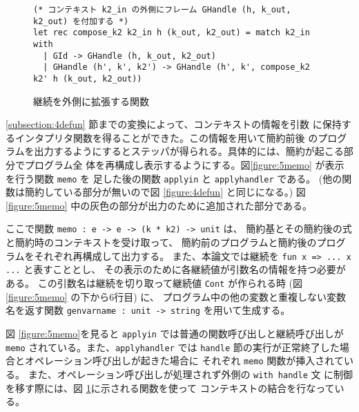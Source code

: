 \begin{figure}
\begin{spacing}{0.9}
\begin{verbatim}
(* コンテキスト k2_in の外側にフレーム GHandle (h, k_out, k2_out) を付加する *)
let rec compose_k2 k2_in h (k_out, k2_out) = match k2_in with
  | GId -> GHandle (h, k_out, k2_out)
  | GHandle (h', k', k2') -> GHandle (h', k', compose_k2 k2' h (k_out, k2_out))
\end{verbatim}
\caption{継続を外側に拡張する関数}
\label{figure:compose}
\end{spacing}
\end{figure}

\ref{subsection:4defun} 節までの変換によって、コンテキストの情報を引数
に保持するインタプリタ関数を得ることができた。この情報を用いて簡約前後
のプログラムを出力するようにするとステッパが得られる。具体的には、簡約が起こる部分でプログラム全
体を再構成し表示するようにする。図\ref{figure:5memo}
が表示を行う関数 \texttt{memo} を
足した後の関数 \texttt{apply\US{}in} と \texttt{apply\US{}handler}
である。
(他の関数は簡約している部分が無いので図 \ref{figure:4defun} と同じになる。)
図 \ref{figure:5memo} 中の灰色の部分が出力のために追加された部分である。

ここで関数 \texttt{memo :\ e -> e -> (k * k2) -> unit} は、
簡約基とその簡約後の式と簡約時のコンテキストを受け取って、
簡約前のプログラムと簡約後のプログラムをそれぞれ再構成して出力する。
また、本論文では継続を \texttt{fun x => ...\ x ...} と表すこととし、
その表示のために各継続値が引数名の情報を持つ必要がある。
この引数名は継続を切り取って継続値 \texttt{Cont} が作られる時 (図 \ref{figure:5memo} の下から6行目) に、
プログラム中の他の変数と重複しない変数名を返す関数 \texttt{gen\US{}var\US{}name :\ unit -> string}
を用いて生成する。

図 \ref{figure:5memo}を見ると \texttt{apply\US{}in} では普通の関数呼び出しと継続呼び出しが
\texttt{memo} されている。また、\texttt{apply\US{}handler} では
\texttt{handle} 節の実行が正常終了した場合とオペレーション呼び出しが起きた場合に
それぞれ \texttt{memo} 関数が挿入されている。
また、オペレーション呼び出しが処理されず外側の \texttt{with handle} 文
に制御を移す際には、図 \ref{figure:compose}に示される関数を使って
コンテキストの結合を行なっている。


